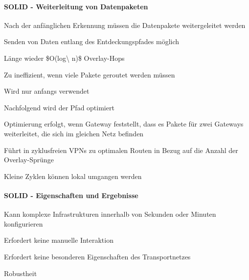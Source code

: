 \documentclass[a4paper]{article}
\begin{document}
\begin{multicols}{3}
\begin{itemize*}
            \paragraph{SOLID - Weiterleitung von
                  Datenpaketen}

            \begin{itemize*}
                  \item
                  Nach der anfänglichen Erkennung müssen die Datenpakete weitergeleitet
                  werden
                  \item
                  Senden von Daten entlang des Entdeckungspfades möglich

                  \begin{itemize*}
                        \item Länge wieder \$O(log\textbackslash{} n)\$ Overlay-Hops
                        \item Zu ineffizient, wenn viele Pakete geroutet werden müssen
                        \item Wird nur anfangs verwendet
                  \end{itemize*}
                  \item
                  Nachfolgend wird der Pfad optimiert

                  \begin{itemize*}
                        \item Optimierung erfolgt, wenn Gateway feststellt, dass es Pakete für zwei Gateways weiterleitet, die sich im gleichen Netz befinden
                        \item Führt in zyklusfreien VPNs zu optimalen Routen in Bezug auf die Anzahl der Overlay-Sprünge
                        \item Kleine Zyklen können lokal umgangen werden
                  \end{itemize*}
            \end{itemize*}


            \paragraph{SOLID - Eigenschaften und
                  Ergebnisse}

            \begin{itemize*}
                  \item
                  Kann komplexe Infrastrukturen innerhalb von Sekunden oder Minuten
                  konfigurieren
                  \item
                  Erfordert keine manuelle Interaktion
                  \item
                  Erfordert keine besonderen Eigenschaften des Transportnetzes
                  \item
                  Robustheit


\end{itemize*}
\end{itemize*}
\end{multicols}
\end{document}
